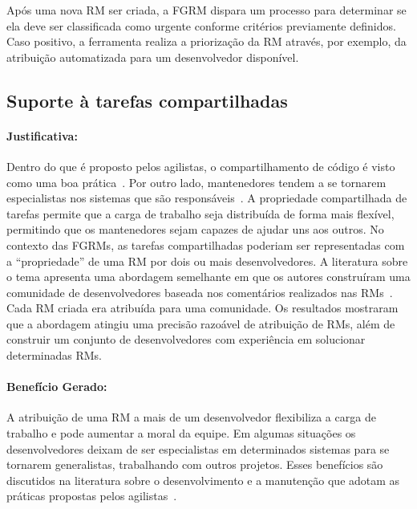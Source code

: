 Após uma nova RM ser criada, a FGRM dispara um processo para determinar se ela
deve ser classificada como urgente conforme critérios previamente definidos.
Caso positivo, a ferramenta realiza a priorização da RM através, por exemplo, da
atribuição automatizada para um desenvolvedor disponível.

\subsection{Suporte à tarefas compartilhadas}
\label{sub:suporte_tarefas_compartilhadas}


\paragraph{Justificativa:}
\label{par:justificativa_s08}

Dentro do que é proposto pelos agilistas, o compartilhamento de código é visto
como uma boa prática~\cite{meyer2014agile}. Por outro lado, mantenedores tendem
a se tornarem especialistas nos sistemas que são
responsáveis~\cite{singer1998practices}. A propriedade compartilhada de tarefas
permite que a carga de trabalho seja distribuída de forma mais flexível,
permitindo que os mantenedores sejam capazes de ajudar uns aos outros. No
contexto das FGRMs, as tarefas compartilhadas poderiam ser representadas com a
``propriedade'' de uma RM por dois ou mais desenvolvedores. A literatura sobre
o tema apresenta uma abordagem semelhante em que os autores construíram uma
comunidade de desenvolvedores baseada nos comentários realizados nas
RMs~\cite{banitaan2013decoba}. Cada RM criada era atribuída para uma
comunidade. Os resultados mostraram que a abordagem atingiu uma precisão
razoável de atribuição de RMs, além de construir um conjunto de desenvolvedores
com experiência em solucionar determinadas RMs.

\paragraph{Benefício Gerado:}
\label{par:papéis_afetados_s08}

A atribuição de uma RM a mais de um desenvolvedor flexibiliza a carga de
trabalho e pode aumentar a moral da equipe. Em algumas situações os
desenvolvedores deixam de ser especialistas em determinados sistemas para se
tornarem generalistas, trabalhando com outros projetos. Esses benefícios são
discutidos na literatura sobre o desenvolvimento e a manutenção que adotam as
práticas propostas pelos agilistas~\cite{dybaa2008empirical,rudzki2009agile}.

